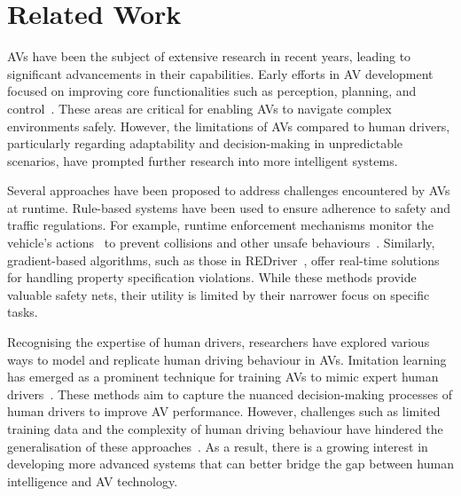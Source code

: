 \section{Related Work}
\label{sec:related}
AVs have been the subject of extensive research in recent years, leading to significant advancements in their capabilities. Early efforts in AV development focused on improving core functionalities such as perception, planning, and control~\cite{levinson2011towards, yurtsever2020survey}. These areas are critical for enabling AVs to navigate complex environments safely. However, the limitations of AVs compared to human drivers, particularly regarding adaptability and decision-making in unpredictable scenarios, have prompted further research into more intelligent systems.


Several approaches have been proposed to address challenges encountered by AVs at runtime. Rule-based systems have been used to ensure adherence to safety and traffic regulations. For example, runtime enforcement mechanisms monitor the vehicle's actions~\cite{Mauritz-et_al16a, d2005lola, Watanabe-et_al18a} to prevent collisions and other unsafe behaviours~\cite{Grieser-et_al20a, hong2020avguardian, Cheng-et_al21a, Shankar-et_al20a}. Similarly, gradient-based algorithms, such as those in REDriver~\cite{sun2024redriver}, offer real-time solutions for handling property specification violations. While these methods provide valuable safety nets, their utility is limited by their narrower focus on specific tasks.

Recognising the expertise of human drivers, researchers have explored various ways to model and replicate human driving behaviour in AVs. Imitation learning has emerged as a prominent technique for training AVs to mimic expert human drivers~\cite{sama2020extracting, wei2010learning, xu2020learning}. These methods aim to capture the nuanced decision-making processes of human drivers to improve AV performance. However, challenges such as limited training data and the complexity of human driving behaviour have hindered the generalisation of these approaches~\cite{le2022survey}. As a result, there is a growing interest in developing more advanced systems that can better bridge the gap between human intelligence and AV technology.

